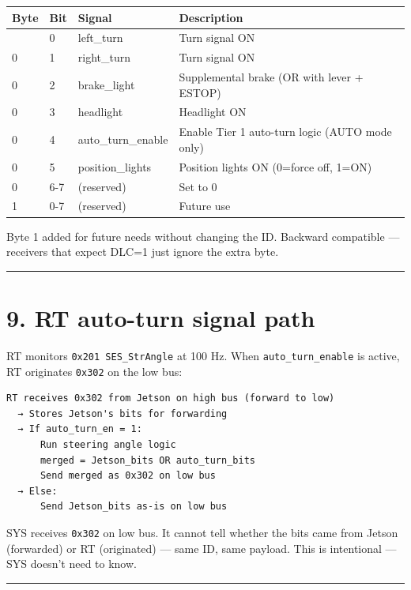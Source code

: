 \documentclass[12pt,a4paper,oneside]{report}
\begin{document}
\begin{longtable}[]{@{}llll@{}}
\toprule\noalign{}
Byte & Bit & Signal & Description \\
\midrule\noalign{}
\endhead
\bottomrule\noalign{}
\endlastfoot
0 & 0 & left\_turn & Turn signal ON \\
0 & 1 & right\_turn & Turn signal ON \\
0 & 2 & brake\_light & Supplemental brake (OR with lever + ESTOP) \\
0 & 3 & headlight & Headlight ON \\
0 & 4 & auto\_turn\_enable & Enable Tier 1 auto-turn logic (AUTO mode only) \\
0 & 5 & position\_lights & Position lights ON (0=force off, 1=ON) \\
0 & 6-7 & (reserved) & Set to 0 \\
1 & 0-7 & (reserved) & Future use \\
\end{longtable}

Byte 1 added for future needs without changing the ID. Backward compatible ---
receivers that expect DLC=1 just ignore the extra byte.

\begin{center}\rule{0.5\linewidth}{0.5pt}\end{center}

\section{9. RT auto-turn signal path}\label{rt-auto-turn-signal-path}

RT monitors \texttt{0x201\ SES\_StrAngle} at 100 Hz. When
\texttt{auto\_turn\_enable} is active, RT originates \texttt{0x302} on the low
bus:

\begin{verbatim}
RT receives 0x302 from Jetson on high bus (forward to low)
  → Stores Jetson's bits for forwarding
  → If auto_turn_en = 1:
      Run steering angle logic
      merged = Jetson_bits OR auto_turn_bits
      Send merged as 0x302 on low bus
  → Else:
      Send Jetson_bits as-is on low bus
\end{verbatim}

SYS receives \texttt{0x302} on low bus. It cannot tell whether the bits came
from Jetson (forwarded) or RT (originated) --- same ID, same payload. This is
intentional --- SYS doesn't need to know.

\begin{center}\rule{0.5\linewidth}{0.5pt}\end{center}
\end{document}
